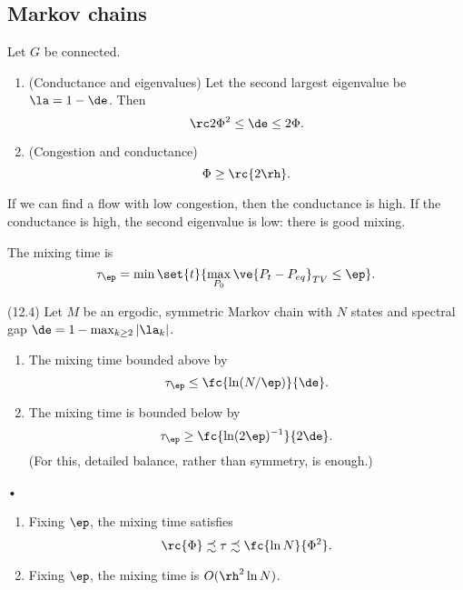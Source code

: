 \subsection{Markov chains}
\begin{thm}
Let $G$ be connected.
\begin{enumerate}
\item (Conductance and eigenvalues)
Let the second largest eigenvalue be $\la = 1-\de$. Then
\[
\rc2\Phi^2\le \de \le 2\Phi.
\]
\item (Congestion and conductance)
\[
\Phi\ge \rc{2\rh}.
\]
\end{enumerate}
\end{thm}
If we can find a flow with low congestion, then the conductance is high. If the conductance is high, the second eigenvalue is low: there is good mixing.
\begin{df}
The mixing time is 
\[
\tau_\ep = \min\set{t}{\max_{P_0} \ve{P_t-P_{eq}}_{TV}\le \ep}.
\]
\end{df}
\begin{thm}(12.4)
Let $M$ be an ergodic, symmetric Markov chain with $N$ states and spectral gap $\de=1-\max_{k\ge2}|\la_k|$.
\begin{enumerate}
\item
The mixing time bounded above by 
\[
\tau_\ep\le\fc{\ln (N/\ep)}{\de}.
\]
\item
The mixing time is bounded below by 
\[
\tau_\ep\ge \fc{\ln(2\ep)^{-1}}{2\de}.
\]
(For this, detailed balance, rather than symmetry, is enough.)
\end{enumerate}•
\end{thm}
\begin{cor}
\begin{enumerate}
\item
Fixing $\ep$, the mixing time satisfies
\[
\rc{\Phi}\precsim \tau \precsim \fc{\ln N}{\Phi^2}.
\]
\item
Fixing $\ep$, the mixing time is $O(\rh^2\ln N)$.
\end{enumerate}
\end{cor}
